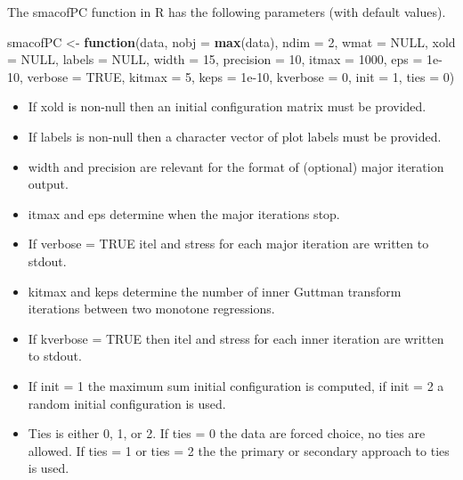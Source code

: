 \documentclass[
  12pt,
]{article}
\newenvironment{Shaded}{\begin{snugshade}}{\end{snugshade}}
\newcommand{\AttributeTok}[1]{\textcolor[rgb]{0.13,0.29,0.53}{#1}}
\newcommand{\ConstantTok}[1]{\textcolor[rgb]{0.56,0.35,0.01}{#1}}
\newcommand{\ControlFlowTok}[1]{\textcolor[rgb]{0.13,0.29,0.53}{\textbf{#1}}}
\newcommand{\DecValTok}[1]{\textcolor[rgb]{0.00,0.00,0.81}{#1}}
\newcommand{\FloatTok}[1]{\textcolor[rgb]{0.00,0.00,0.81}{#1}}
\newcommand{\FunctionTok}[1]{\textcolor[rgb]{0.13,0.29,0.53}{\textbf{#1}}}
\newcommand{\NormalTok}[1]{#1}
\newcommand{\OtherTok}[1]{\textcolor[rgb]{0.56,0.35,0.01}{#1}}
\providecommand{\tightlist}{%
  \setlength{\itemsep}{0pt}\setlength{\parskip}{0pt}}
\begin{document}
The smacofPC function in R has the following parameters (with default values).

\begin{Shaded}
\begin{Highlighting}[]
\NormalTok{smacofPC }\OtherTok{\textless{}{-}} \ControlFlowTok{function}\NormalTok{(data,}
                     \AttributeTok{nobj =} \FunctionTok{max}\NormalTok{(data),}
                     \AttributeTok{ndim =} \DecValTok{2}\NormalTok{,}
                     \AttributeTok{wmat =} \ConstantTok{NULL}\NormalTok{,}
                     \AttributeTok{xold =} \ConstantTok{NULL}\NormalTok{,}
                     \AttributeTok{labels =} \ConstantTok{NULL}\NormalTok{,}
                     \AttributeTok{width =} \DecValTok{15}\NormalTok{,}
                     \AttributeTok{precision =} \DecValTok{10}\NormalTok{,}
                     \AttributeTok{itmax =} \DecValTok{1000}\NormalTok{,}
                     \AttributeTok{eps =} \FloatTok{1e{-}10}\NormalTok{,}
                     \AttributeTok{verbose =} \ConstantTok{TRUE}\NormalTok{,}
                     \AttributeTok{kitmax =} \DecValTok{5}\NormalTok{,}
                     \AttributeTok{keps =} \FloatTok{1e{-}10}\NormalTok{,}
                     \AttributeTok{kverbose =} \DecValTok{0}\NormalTok{,}
                     \AttributeTok{init =} \DecValTok{1}\NormalTok{,}
                     \AttributeTok{ties =} \DecValTok{0}\NormalTok{)}
\end{Highlighting}
\end{Shaded}

\begin{itemize}
\tightlist
\item
  If xold is non-null then an initial configuration matrix must be provided.
\item
  If labels is non-null then a character vector of plot labels must be provided.
\item
  width and precision are relevant for the format of (optional) major iteration output.
\item
  itmax and eps determine when the major iterations stop.
\item
  If verbose = TRUE itel and stress for each major iteration are
  written to stdout.
\item
  kitmax and keps determine the number of inner Guttman transform iterations
  between two monotone regressions.
\item
  If kverbose = TRUE then itel and stress for each inner iteration are written to stdout.
\item
  If init = 1 the maximum sum initial configuration is computed, if init = 2 a random initial configuration is used.
\item
  Ties is either 0, 1, or 2. If ties = 0 the data are forced choice, no ties
  are allowed. If ties = 1 or ties = 2 the the primary or secondary approach
  to ties is used.
\end{itemize}
\end{document}
